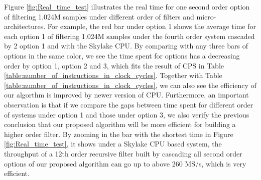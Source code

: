 Figure \ref{fig:Real_time_test} illustrates the real time for one second order option
of filtering 1.024M samples under different order of filters and micro-architectures. For example,
the red bar under option 1 shows the average time for each option 1 of filtering 1.024M samples under 
the fourth order system cascaded by 2 option 1 and with the Skylake CPU. 
By comparing with any three bars of options in the same color, we see the time spent for options has a decreasing order
by option 1, option 2 and 3, which fits the result of CPS in Table \ref{table:number_of_instructions_in_clock_cycles}. 
Together with Table \ref{table:number_of_instructions_in_clock_cycles}, 
we can also see the efficiency of our algorthm is improved by newer version of CPU.
Furthermore, an important observation is that if we compare the gaps between time spent for different order of systems under option 1
and those under option 3, we also verify the previous conclusion that our proposed algorithm will be more efficient for building a higher order filter.
By zooming in the bar with the shortest time in Figure \ref{fig:Real_time_test},
it shows under a Skylake CPU based system, the throughput of a 12th order recursive filter built by
cascading all second order options of our proposed algorithm can go up to above 260 MS$\slash$s, which is very efficient.
















